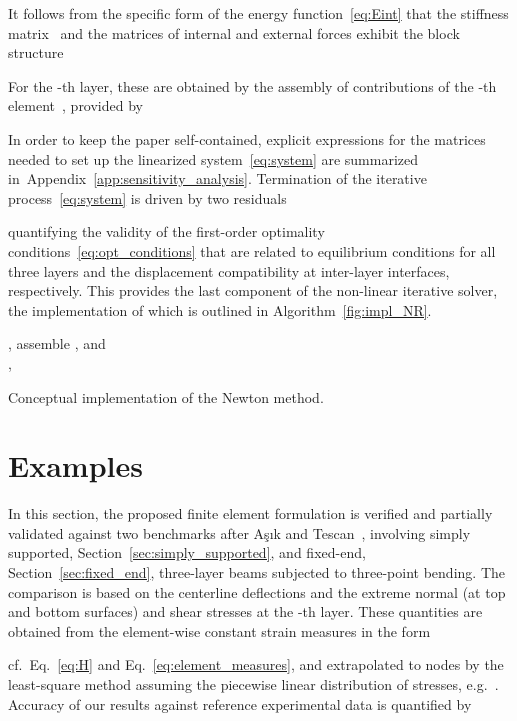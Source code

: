 \documentclass[11pt]{article}
\newcommand{\rev}[1]{#1}
\newcommand{\Eref}[1]{Eq.~\eqref{#1}}
\newcommand{\Aref}[1]{Appendix~\ref{#1}}
\newcommand{\Sref}[1]{Section~\ref{#1}}
\newcommand{\Alref}[1]{Algorithm~\ref{#1}}
\begin{document}
It follows from the specific form of the energy function~\eqref{eq:Eint} that
the stiffness matrix~ and the matrices of internal  and external
forces  exhibit the block structure

For the -th layer, these are obtained by the assembly of contributions of
the -th element~\cite{Jirasek:2002:IAS}, provided by
 
In order to keep the paper self-contained, explicit expressions for the matrices
needed to set up the linearized system~\eqref{eq:system} are summarized
in~\Aref{app:sensitivity_analysis}. Termination of the iterative
process~\eqref{eq:system} is driven by two
residuals~\cite[Section~14.1]{Bonnans:2003:NOTPA}

quantifying the validity of the first-order optimality
conditions~\eqref{eq:opt_conditions} \rev{that are related to equilibrium
conditions for all three layers and the displacement compatibility at
inter-layer interfaces, respectively.} This provides the last component of the
non-linear iterative solver, the implementation of which is outlined in
\Alref{fig:impl_NR}.

\begin{algorithm}[h]
 \KwResult{, }
 , 
 assemble ,  and \\ 
 \While{ or }{assemble  \\
 solve for  from \Eref{eq:system}\\ 
 \\
 assemble ,  and \\ 
  \\
 } 
 , 
 \caption{Conceptual implementation of the Newton method.}
 \label{fig:impl_NR}
\end{algorithm}

\section{Examples}\label{sec:examples}

In this section, the proposed finite element formulation is verified and
partially validated against two benchmarks after A\c{s}\i{}k and
Tescan~\cite{Asik:2005:MMB}, involving simply supported,
\Sref{sec:simply_supported}, and fixed-end, \Sref{sec:fixed_end}, three-layer
beams subjected to three-point bending. The comparison is based on the
centerline deflections and \rev{the extreme normal (at top and bottom surfaces)
and shear stresses at the -th layer. These quantities} are obtained from the
element-wise constant strain measures in the form
\rev{}
cf.~\Eref{eq:H} and \Eref{eq:element_measures}, and extrapolated to nodes by the
least-square method assuming the piecewise linear distribution of stresses,
e.g.~\cite{Hinton:1974:LGS}. Accuracy of our results against reference
experimental data is quantified by
\end{document}
